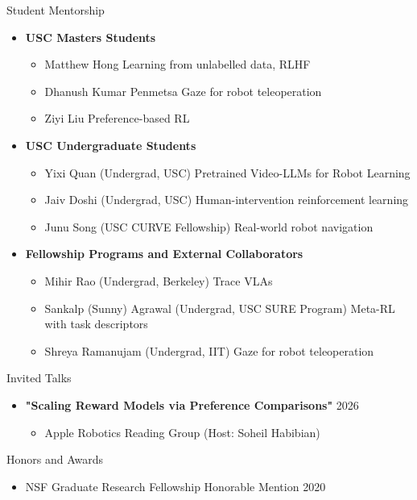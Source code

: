 \documentclass{resume}
\begin{document}
\begin{rSection}{Student Mentorship}
\begin{itemize}[leftmargin=*]
    \item[] \textbf{USC Masters Students}
    \begin{itemize}
        \item Matthew Hong \hfill Learning from unlabelled data, RLHF
        \item Dhanush Kumar Penmetsa \hfill Gaze for robot teleoperation
        \item Ziyi Liu \hfill Preference-based RL
    \end{itemize}

    \item[] \textbf{USC Undergraduate Students}
    \begin{itemize}
        \item Yixi Quan (Undergrad, USC) \hfill Pretrained Video-LLMs for Robot Learning
        \item Jaiv Doshi (Undergrad, USC) \hfill Human-intervention reinforcement learning
        \item Junu Song (USC CURVE Fellowship) \hfill Real-world robot navigation
    \end{itemize}

    \item[] \textbf{Fellowship Programs and External Collaborators}
    \begin{itemize}
        \item Mihir Rao (Undergrad, Berkeley) \hfill Trace VLAs
        \item Sankalp (Sunny) Agrawal (Undergrad, USC SURE Program) \hfill Meta-RL with task descriptors
        \item Shreya Ramanujam (Undergrad, IIT) \hfill Gaze for robot teleoperation
    \end{itemize}
\end{itemize}
\end{rSection}

\begin{rSection}{Invited Talks}
\begin{itemize}[leftmargin=*]
\item[] \textbf{"Scaling Reward Models via Preference Comparisons"} \hfill 2026 
    \begin{itemize}
        \item Apple Robotics Reading Group \hfill (Host: Soheil Habibian) 
    \end{itemize}
\end{itemize}
\end{rSection}

\begin{rSection}{Honors and Awards}
\begin{itemize}
\item NSF Graduate Research Fellowship Honorable Mention \hfill 2020 
\end{itemize}
\end{rSection}
\end{document}
